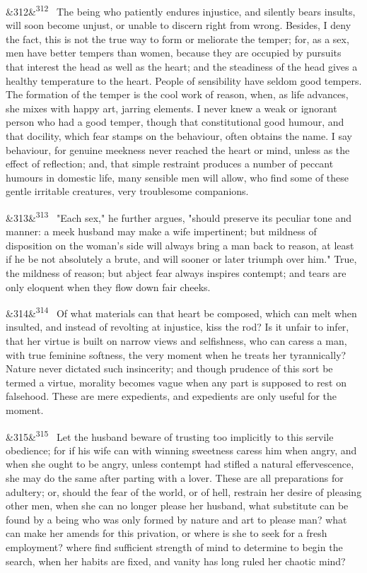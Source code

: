 \documentclass[12pt]{article}
\newcommand{\para}[1][]{\par\noindent\ifx&#1&\else\textsuperscript{\footnotesize #1}~\fi}
\begin{document}
\para[312] The being who patiently endures injustice, and silently bears insults, will soon become unjust, or unable to discern right from wrong. Besides, I deny the fact, this is not the true way to form or meliorate the temper; for, as a sex, men have better tempers than women, because they are occupied by pursuits that interest the head as well as the heart; and the steadiness of the head gives a healthy temperature to the heart. People of sensibility have seldom good tempers. The formation of the temper is the cool work of reason, when, as life advances, she mixes with happy art, jarring elements. I never knew a weak or ignorant person who had a good temper, though that constitutional good humour, and that docility, which fear stamps on the behaviour, often obtains the name. I say behaviour, for genuine meekness never reached the heart or mind, unless as the effect of reflection; and, that simple restraint produces a number of peccant humours in domestic life, many sensible men will allow, who find some of these gentle irritable creatures, very troublesome companions.

\para[313] "Each sex," he further argues, "should preserve its peculiar tone and manner: a meek husband may make a wife impertinent; but mildness of disposition on the woman's side will always bring a man back to reason, at least if he be not absolutely a brute, and will sooner or later triumph over him." True, the mildness of reason; but abject fear always inspires contempt; and tears are only eloquent when they flow down fair cheeks.

\para[314] Of what materials can that heart be composed, which can melt when insulted, and instead of revolting at injustice, kiss the rod? Is it unfair to infer, that her virtue is built on narrow views and selfishness, who can caress a man, with true feminine softness, the very moment when he treats her tyrannically? Nature never dictated such insincerity; and though prudence of this sort be termed a virtue, morality becomes vague when any part is supposed to rest on falsehood. These are mere expedients, and expedients are only useful for the moment.

\para[315] Let the husband beware of trusting too implicitly to this servile obedience; for if his wife can with winning sweetness caress him when angry, and when she ought to be angry, unless contempt had stifled a natural effervescence, she may do the same after parting with a lover. These are all preparations for adultery; or, should the fear of the world, or of hell, restrain her desire of pleasing other men, when she can no longer please her husband, what substitute can be found by a being who was only formed by nature and art to please man? what can make her amends for this privation, or where is she to seek for a fresh employment? where find sufficient strength of mind to determine to begin the search, when her habits are fixed, and vanity has long ruled her chaotic mind?
\end{document}
